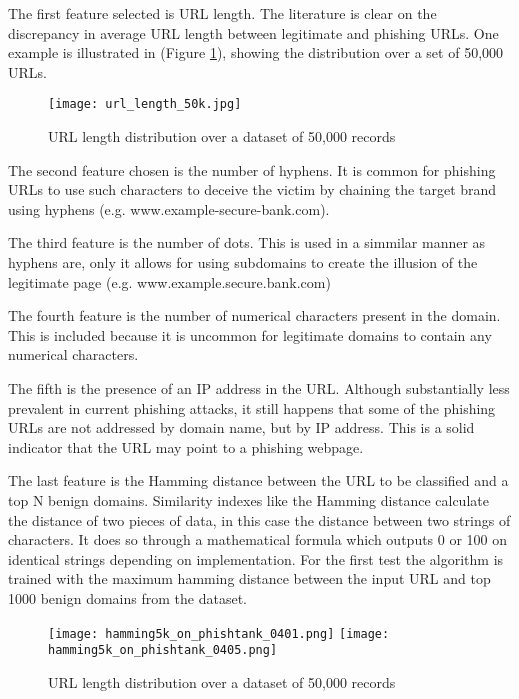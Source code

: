 The first feature selected is URL length. The literature is clear on the discrepancy in average URL length between legitimate and phishing URLs. One example is illustrated in \cite{STACKED_ML_URL_HTML} (Figure \ref{fig:URL_LENGTH_DISTRIBUTION}), showing the distribution over a set of 50,000 URLs.

\begin{figure}[t]
	\centering
	\texttt{[image: url\_length\_50k.jpg]}
	\caption{URL length distribution over a dataset of 50,000 records}
	\label{fig:URL_LENGTH_DISTRIBUTION}
\end{figure}

The second feature chosen is the number of hyphens. It is common for phishing URLs to use such characters to deceive the victim by chaining the target brand using hyphens (e.g. www.example-secure-bank.com).

The third feature is the number of dots. This is used in a simmilar manner as hyphens are, only it allows for using subdomains to create the illusion of the legitimate page (e.g. www.example.secure.bank.com)

The fourth feature is the number of numerical characters present in the domain. This is included because it is uncommon for legitimate domains to contain any numerical characters.

The fifth is the presence of an IP address in the URL. Although substantially less prevalent in current phishing attacks, it still happens that some of the phishing URLs are not addressed by domain name, but by IP address. This is a solid indicator that the URL may point to a phishing webpage.

The last feature is the Hamming distance between the URL to be classified and a top N benign domains. Similarity indexes like the Hamming distance calculate the distance of two pieces of data, in this case the distance between two strings of characters. It does so through a mathematical formula which outputs 0 or 100 on identical strings depending on implementation. For the first test the algorithm is trained with the maximum hamming distance between the input URL and top 1000 benign domains from the \cite{MAJESTIC_MILLION} dataset.

\begin{figure}
	\centering
	\texttt{[image: hamming5k\_on\_phishtank\_0401.png]}
	\texttt{[image: hamming5k\_on\_phishtank\_0405.png]}
	\caption{URL length distribution over a dataset of 50,000 records}
	\label{fig:HAMMING_ON_PHISHTANK}
\end{figure}


